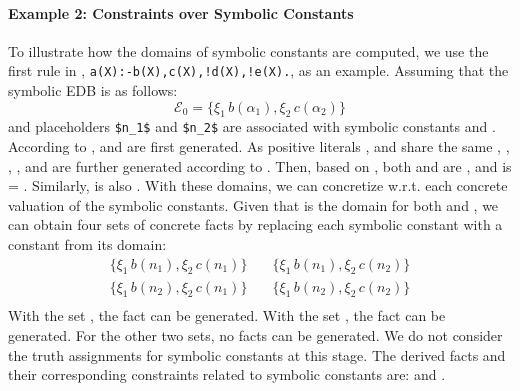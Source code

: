 \paragraph*{\textbf{Example 2: Constraints over Symbolic Constants}} 
To illustrate how the domains of symbolic constants are computed, we use the first rule in , \lstinline[mathescape]{a(X):-b(X),c(X),!d(X),!e(X).}, as an example.
Assuming that the symbolic EDB is as follows: 
\[\mathcal{E}_0 = {\{\xi_1 \, b(\alpha_1), \xi_2 \, c(\alpha_2)\}}\]
\noindent 
and placeholders \lstinline[mathescape]`$n_1$` and \lstinline[mathescape]`$n_2$` 
are associated with symbolic constants  and . 
According to \code{[D0]},  and  are first generated.
As positive literals ,  and  share the same , , , , and  are further  generated according to \code{[D3]}.
Then, based on \code{[Dom]}, both  and  are , and 
 is 
= .
Similarly,  is also . 
With these domains, we can concretize  w.r.t. each concrete valuation of the symbolic constants. 
Given that  is the domain for both  and , 
we can obtain four sets of concrete facts by replacing each symbolic constant with a constant from its domain:
\begin{align*}
\{\xi_1\,b(n_1), \xi_2\,c(n_1)\} &\quad \{\xi_1\,b(n_1), \xi_2\,c(n_2)\} \\
\{\xi_1\,b(n_2), \xi_2\,c(n_1)\} &\quad \{\xi_1\,b(n_2), \xi_2\,c(n_2)\} \\
\end{align*}
With the set , the fact  can be generated.
With the set , the fact  can be generated.
For the other two sets, no facts can be generated.
We do not consider the truth assignments for symbolic constants at this stage.
The derived facts and their corresponding constraints related to symbolic constants are:
 and .

